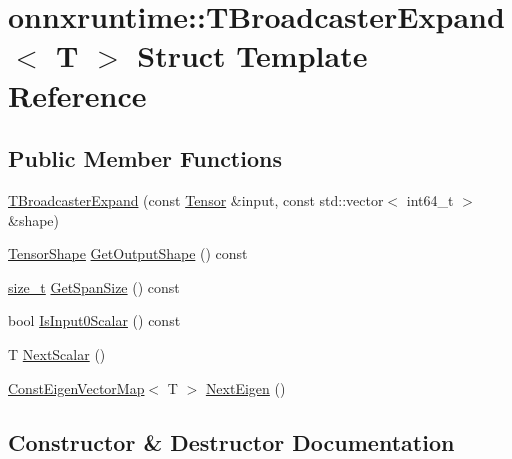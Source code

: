 \hypertarget{structonnxruntime_1_1TBroadcasterExpand}{}\section{onnxruntime\+:\+:T\+Broadcaster\+Expand$<$ T $>$ Struct Template Reference}
\label{structonnxruntime_1_1TBroadcasterExpand}
\subsection*{Public Member Functions}
\begin{DoxyCompactItemize}
\item 
\mbox{\hyperlink{structonnxruntime_1_1TBroadcasterExpand_a3c6e48da90bcd15e9cf6ba7b9cc63289}{T\+Broadcaster\+Expand}} (const \mbox{\hyperlink{classonnxruntime_1_1Tensor}{Tensor}} \&input, const std\+::vector$<$ int64\+\_\+t $>$ \&shape)
\item 
\mbox{\hyperlink{classonnxruntime_1_1TensorShape}{Tensor\+Shape}} \mbox{\hyperlink{structonnxruntime_1_1TBroadcasterExpand_a67d4843aedc9e85848c2c875b728e649}{Get\+Output\+Shape}} () const
\item 
\mbox{\hyperlink{mlasi_8h_a503efbc1c6e50825320ad909366b78ab}{size\+\_\+t}} \mbox{\hyperlink{structonnxruntime_1_1TBroadcasterExpand_af97cb7082da7e26d1741748983d34b83}{Get\+Span\+Size}} () const
\item 
bool \mbox{\hyperlink{structonnxruntime_1_1TBroadcasterExpand_ae8492f89a6100cd05dd890f74a9596d5}{Is\+Input0\+Scalar}} () const
\item 
T \mbox{\hyperlink{structonnxruntime_1_1TBroadcasterExpand_a761c9e4cb5fc6ca6f48b5cfdb4ab68a1}{Next\+Scalar}} ()
\item 
\mbox{\hyperlink{namespaceonnxruntime_a16eca66228ee3a40fe3ae89db53e08ee}{Const\+Eigen\+Vector\+Map}}$<$ T $>$ \mbox{\hyperlink{structonnxruntime_1_1TBroadcasterExpand_a6e8353c3f6e4d485bf4d74f5cedeeba3}{Next\+Eigen}} ()
\end{DoxyCompactItemize}


\subsection{Constructor \& Destructor Documentation}
\mbox{\label{structonnxruntime_1_1TBroadcasterExpand_a3c6e48da90bcd15e9cf6ba7b9cc63289}} 
